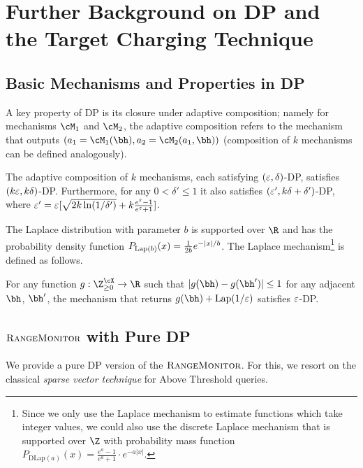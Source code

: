 \section{Further Background on DP and the Target Charging Technique}

\subsection{Basic Mechanisms and Properties in DP}

\label{sec:basic_DP_properties}

A key property of DP is its closure under adaptive composition; namely for mechanisms $\cM_1$ and $\cM_2$, the adaptive composition refers to the mechanism that outputs $(a_1 = \cM_1(\bh), a_2 = \cM_2(a_1, \bh))$ (composition of $k$ mechanisms can be defined analogously).

\begin{proposition}\label{prop:dp-composition}
The adaptive composition of $k$ mechanisms, each satisfying $(\varepsilon, \delta)$-DP, satisfies $(k\varepsilon, k\delta)$-DP. Furthermore, for any $0<\delta'\leq 1$ it also satisfies $(\varepsilon',k\delta+\delta')$-DP, where $\varepsilon'=\varepsilon[\sqrt{2k\ln(1/\delta')}+k\frac{e^{\varepsilon}-1}{e^{\varepsilon}+1}]$.
\end{proposition}

The Laplace distribution with parameter $b$ is supported over $\R$ and has the probability density function $P_{\operatorname{Lap}(b)}(x) = \frac{1}{2b} e^{-|x|/b}$. The Laplace mechanism\footnote{
Since we only use the Laplace mechanism to estimate functions which take integer values, we could also use the discrete Laplace mechanism that is supported over $\Z$ with probability mass function $P_{\mathrm{DLap}(a)}(x) = \frac{e^a-1}{e^a+1} \cdot e^{-a|x|}$.
} is defined as follows.

\begin{proposition}\label{prop:laplace}
For any function $g: \Z_{\ge 0}^{\cX} \to \R$ such that $|g(\bh) - g(\bh')| \le 1$ for any adjacent $\bh$, $\bh'$, the mechanism that returns $g(\bh) + \Lap(1/\eps)$ satisfies $\varepsilon$-DP.
\end{proposition}

\subsection{$\textsc{RangeMonitor}$ with Pure DP}\label{sec:OIM_pure_DP}

We provide a pure DP version of the $\textsc{RangeMonitor}$. For this, we resort on the classical {\em sparse vector technique} for Above Threshold queries.


